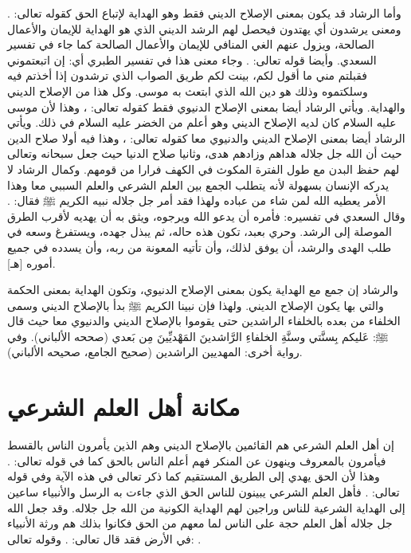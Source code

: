 وأما الرشاد قد يكون بمعنى الإصلاح الديني فقط وهو الهداية لإتباع الحق كقوله تعالى: \quranayah*[2][186]{\footnotesize \surahname*[186]}. ومعنى يرشدون أي يهتدون فيحصل لهم الرشد الديني الذي هو الهداية للإيمان والأعمال الصالحة، ويزول عنهم الغي المنافي للإيمان والأعمال الصالحة كما جاء في تفسير السعدي. وأيضا قوله تعالى: \quranayah*[40][38]{\footnotesize \surahname*[40]}. وجاء معنى هذا في تفسير الطبري أي: إن اتبعتموني فقبلتم مني ما أقول لكم، بينت لكم طريق الصواب الذي ترشدون إذا أخذتم فيه وسلكتموه وذلك هو دين الله الذي ابتعث به موسى. وكل هذا من الإصلاح الديني والهداية. ويأتي الرشاد أيضا بمعنى الإصلاح الدنيوي فقط كقوله تعالى: \quranayah*[18][66]{\footnotesize \surahname*[18]}، وهذا لأن موسى عليه السلام كان لديه الإصلاح الديني وهو أعلم من الخضر عليه السلام في ذلك. ويأتي الرشاد أيضا بمعنى الإصلاح الديني والدنيوي معا كقوله تعالى: \quranayah*[18][10]{\footnotesize \surahname*[10]}، وهذا فيه أولا صلاح الدين حيث أن الله جل جلاله هداهم وزادهم هدى، وثانيا  صلاح الدنيا حيث جعل سبحانه وتعالى لهم حفظ البدن مع طول الفترة المكوث في الكهف فرارا من قومهم. وكمال الرشاد لا يدركه الإنسان بسهولة لأنه يتطلب الجمع بين العلم الشرعي والعلم السببي معا وهذا الأمر يعطيه الله لمن شاء من عباده ولهذا فقد أمر جل جلاله نبيه الكريم ﷺ فقال: \quranayah*[18][24][5]{\footnotesize \surahname*[18]}. وقال السعدي في تفسيره: فأمره أن يدعو الله ويرجوه، ويثق به أن يهديه لأقرب الطرق الموصلة إلى الرشد. وحري بعبد، تكون هذه حاله، ثم يبذل جهده، ويستفرغ وسعه في طلب الهدى والرشد، أن يوفق لذلك، وأن تأتيه المعونة من ربه، وأن يسدده في جميع أموره [هـ].

والرشاد إن جمع مع الهداية يكون بمعنى الإصلاح الدنيوي، وتكون الهداية بمعنى الحكمة والتي بها يكون الإصلاح الديني. ولهذا فإن نبينا الكريم ﷺ بدأ بالإصلاح الديني وسمى الخلفاء من بعده بالخلفاء الراشدين حتى يقوموا بالإصلاح الديني والدنيوي معا حيث قال ﷺ: عَليكم بِسنَّتي وسنَّةِ الخلفاءِ الرَّاشدينَ المَهْديِّينَ مِن بَعدي {\footnotesize (صححه الألباني)}. وفي رواية أخرى: المهديين الراشدين {\footnotesize (صحيح الجامع، صحيحه الألباني)}.

\section{مكانة أهل العلم الشرعي}

إن أهل العلم الشرعي هم القائمين بالإصلاح الديني وهم الذين يأمرون الناس بالقسط فيأمرون بالمعروف وينهون عن المنكر فهم أعلم الناس بالحق كما في قوله تعالى:
\quranayah*[34][6]{\footnotesize \surahname*[34]}. وهذا لأن الحق يهدي إلى الطريق المستقيم كما ذكر تعالى في هذه الآية وفي قوله تعالى:
\quranayah*[22][54]{\footnotesize \surahname*[22]}. فأهل العلم الشرعي يبينون للناس الحق الذي جاءت به الرسل والأنبياء ساعين إلى الهداية الشرعية للناس وراجين لهم الهداية الكونية من الله جل جلاله. وقد جعل الله جل جلاله أهل العلم حجة على الناس لما معهم من الحق فكانوا بذلك هم ورثة الأنبياء في الأرض فقد قال تعالى:
\quranayah*[17][107]{\footnotesize \surahname*[17]}.
وقوله تعالى:
\quranayah*[29][49]{\footnotesize \surahname*[29]}.


